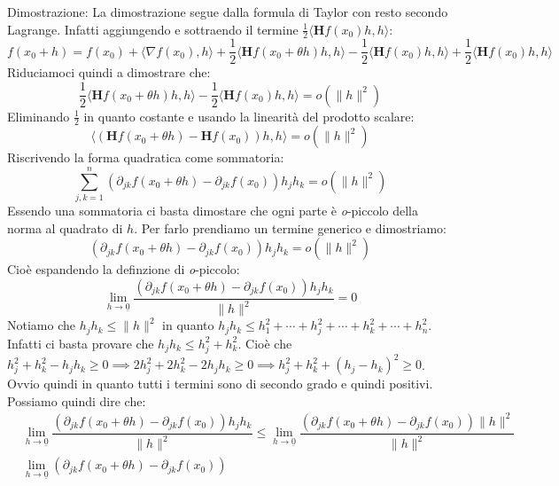 Dimostrazione: La dimostrazione segue dalla formula di Taylor con resto secondo 
Lagrange. Infatti aggiungendo e sottraendo il termine $\frac{1}{2}\langle 
\mathbf{H}f(x_0)h, h \rangle$:
\begin{equation*}
	f(x_0 + h) = f(x_0) + \langle \nabla f(x_0), h \rangle + \dfrac{1}{2} 
	\langle \mathbf{H}f(x_0 + \theta h)h, h \rangle - \frac{1}{2}\langle 
	\mathbf{H}f(x_0)h, h \rangle + \frac{1}{2}\langle \mathbf{H}f(x_0)h, h 
	\rangle
\end{equation*}
Riduciamoci quindi a dimostrare che:
\begin{equation*}
	\dfrac{1}{2} \langle \mathbf{H}f(x_0 + \theta h)h, h \rangle - \frac{1}
	{2}\langle \mathbf{H}f(x_0)h, h \rangle = o(\lVert h \rVert^2)
\end{equation*}
Eliminando $\frac{1}{2}$ in quanto costante e usando la linearità del prodotto 
scalare:
\begin{equation*}
	\langle (\mathbf{H}f(x_0 + \theta h) - \mathbf{H}f(x_0))h, h \rangle = 
	o(\lVert h \rVert^2)
\end{equation*}
Riscrivendo la forma quadratica come sommatoria:
\begin{equation*}
	\sum_{j, k = 1}^n (\partial_{jk} f(x_0 + \theta h) - \partial_{jk} 
	f(x_0))h_jh_k = o(\lVert h \rVert^2)
\end{equation*}
Essendo una sommatoria ci basta dimostare che ogni parte è \textit{o}-piccolo 
della norma al quadrato di $h$. Per farlo prendiamo un termine generico e 
dimostriamo:
\begin{equation*}
	(\partial_{jk} f(x_0 + \theta h) - \partial_{jk} f(x_0))h_jh_k = 
	o(\lVert h \rVert^2)
\end{equation*}
Cioè espandendo la definzione di \textit{o}-piccolo:
\begin{equation*}
	\lim_{h \to \underline{0}} \dfrac{ (\partial_{jk} f(x_0 + \theta h) - 
	\partial_{jk} f(x_0))h_jh_k}{\lVert h \rVert^2} = 0
\end{equation*}
Notiamo che $h_jh_k \leq \lVert h \rVert^2$ in quanto $h_jh_k \leq h_1^2 + 
\cdots + h_j^2 + \cdots + h_k^2 + \cdots + h_n^2$. Infatti ci basta provare 
che $h_jh_k \leq h_j^2 + h_k^2$. Cioè che $h_j^2 + h_k^2 - h_jh_k \geq 0 
\implies 2h_j^2 + 2h_k^2 - 2h_jh_k \geq 0 \implies h_j^2 + h_k^2 + (h_j - 
h_k)^2 \geq 0$. Ovvio quindi in quanto tutti i termini sono di secondo grado e 
quindi positivi. Possiamo quindi dire che:
\begin{align*}
	&\lim_{h \to \underline{0}} \dfrac{ (\partial_{jk} f(x_0 + \theta h) - 
	\partial_{jk} f(x_0))h_jh_k}{\lVert h \rVert^2} \leq \lim_{h \to 
	\underline{0}} \dfrac{ (\partial_{jk} f(x_0 + \theta h) - \partial_{jk} 
	f(x_0))\lVert h \rVert^2}{\lVert h \rVert^2}\\[5pt]
	&\lim_{h \to \underline{0}} (\partial_{jk} f(x_0 + \theta h) - 
	\partial_{jk} f(x_0))
\end{align*}

